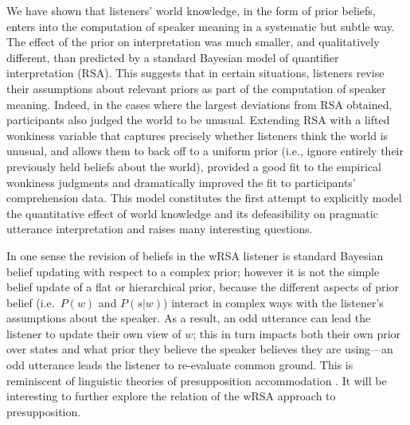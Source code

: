 \documentclass[10pt,letterpaper]{article}
\newcommand{\red}[1]{\textcolor{Red}{#1}}
\begin{document}
We have shown that listeners' world knowledge, in the form of prior beliefs, enters into the computation of speaker meaning in a systematic but subtle way. The effect of the prior on interpretation was much smaller, and qualitatively different, than predicted by a standard Bayesian model of quantifier interpretation (RSA). 
This suggests that in certain situations, listeners revise their assumptions about relevant priors as part of the computation of speaker meaning. 
Indeed, in the cases where the largest deviations from RSA obtained, participants also judged the world to be unusual.
Extending RSA with a lifted wonkiness variable that captures precisely whether listeners think the world is unusual, and allows them to back off to a uniform prior (i.e., ignore entirely their previously held beliefs about the world), provided a good fit to the empirical wonkiness judgments and dramatically improved the fit to participants' comprehension data. This model constitutes the first attempt to explicitly model the quantitative effect of world knowledge and its defeasibility on pragmatic utterance interpretation and raises many interesting questions.

In one sense the revision of beliefs in the wRSA listener is standard Bayesian belief updating with respect to a complex prior; however it is not the simple belief update of a flat or hierarchical prior, because the different aspects of prior belief (i.e.~$P(w)$ and $P(s|w)$) interact in complex ways with the listener's assumptions about the speaker.
As a result, an odd utterance can lead the listener to update their own view of $w$; this in turn impacts both their own prior over states and what prior they believe the speaker believes they are using---an odd utterance leads the listener to re-evaluate common ground. 
This is reminiscent of linguistic theories of presupposition accommodation \cite{lewis1979,stalnaker1973,stalnaker1998}.
It will be interesting to further explore the relation of the wRSA approach to presupposition.
\end{document}
